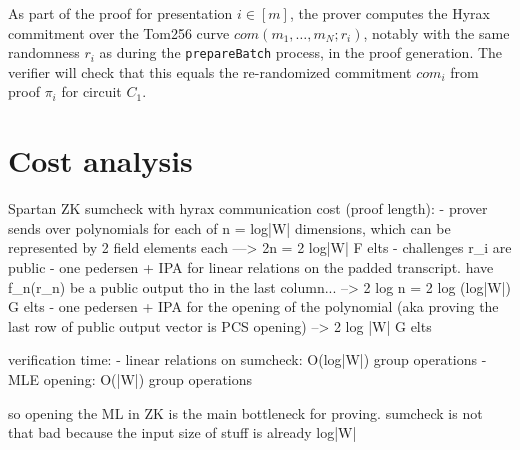As part of the proof for presentation $i \in [m]$, the prover computes the Hyrax commitment over the Tom256 curve $com(m_1, \dots, m_N; r_i)$, 
notably with the same randomness $r_i$ as during the \texttt{prepareBatch} process, in the proof generation. 
The verifier will check that this equals the re-randomized commitment $com_i$ from proof $\pi_i$ for circuit $C_1$. 

\section{Cost analysis}

Spartan ZK sumcheck with hyrax communication cost (proof length):
- prover sends over polynomials for each of n = log|W| dimensions, which can be represented by 2 field elements each ---> 2n = 2 log|W| F elts
- challenges r_i are public
- one pedersen + IPA for linear relations on the padded transcript. have f_n(r_n) be a public output tho in the last column... --> 2 log n = 2 log (log|W|) G elts
- one pedersen + IPA for the opening of the polynomial (aka proving the last row of public output vector is PCS opening) --> 2 log |W| G elts

verification time:
- linear relations on sumcheck: O(log|W|) group operations
- MLE opening: O(|W|) group operations 

so opening the ML in ZK is the main bottleneck for proving. sumcheck is not that bad because the input size of stuff is already log|W|


